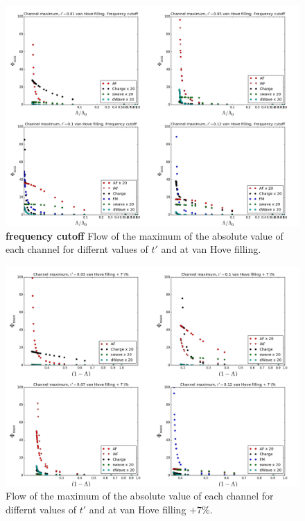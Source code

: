 \begin{figure}
\includegraphics[scale=0.32,angle =90]{images/freqvanhove.png}
\caption{\textbf{frequency cutoff} Flow of the maximum of the absolute value of each channel for differnt values of $t'$ and at van Hove filling. } 
\label{freqlam} 
\end{figure}

\begin{figure}
\includegraphics[scale=0.32,angle =90]{images/vanhovepluslambda.png}
\caption{Flow of the maximum of the absolute value of each channel for differnt values of $t'$ and at van Hove filling $+7 \%$.
} 
\label{lamvanplus} 
\end{figure}


